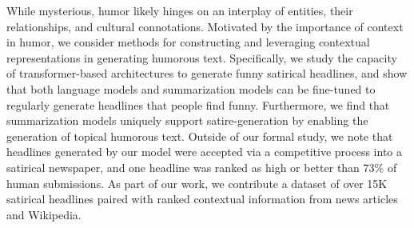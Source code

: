 While mysterious, humor likely hinges on an interplay of entities, their relationships, and cultural connotations. Motivated by the importance of context in humor, we consider methods for constructing and leveraging contextual representations in generating humorous text.  Specifically, we study the capacity of transformer-based architectures to generate funny satirical headlines, and show that both language models and summarization models can be fine-tuned to regularly generate headlines that people find funny. Furthermore, we find that summarization models uniquely support satire-generation by enabling the generation of topical humorous text. Outside of our formal study, we note that headlines generated by our model were accepted via a competitive process into a satirical newspaper, and one headline was ranked as high or better than 73\% of human submissions. As part of our work, we contribute a dataset of over 15K satirical headlines paired with ranked contextual information from news articles and Wikipedia.
